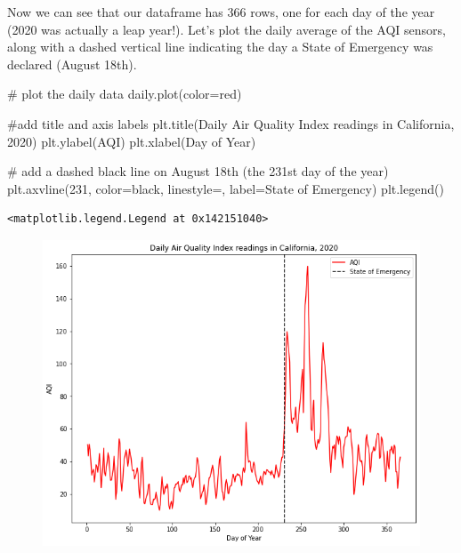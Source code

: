 \documentclass[
  letterpaper,
  DIV=11,
  numbers=noendperiod]{scrreprt}
\newenvironment{Shaded}{\begin{snugshade}}{\end{snugshade}}
\newcommand{\CommentTok}[1]{\textcolor[rgb]{0.37,0.37,0.37}{#1}}
\newcommand{\DecValTok}[1]{\textcolor[rgb]{0.68,0.00,0.00}{#1}}
\newcommand{\NormalTok}[1]{\textcolor[rgb]{0.00,0.23,0.31}{#1}}
\newcommand{\OperatorTok}[1]{\textcolor[rgb]{0.37,0.37,0.37}{#1}}
\newcommand{\StringTok}[1]{\textcolor[rgb]{0.13,0.47,0.30}{#1}}
\begin{document}
Now we can see that our dataframe has 366 rows, one for each day of the
year (2020 was actually a leap year!). Let's plot the daily average of
the AQI sensors, along with a dashed vertical line indicating the day a
State of Emergency was declared (August 18th).

\begin{Shaded}
\begin{Highlighting}[]
\CommentTok{\# plot the daily data}
\NormalTok{daily.plot(color}\OperatorTok{=}\StringTok{\textquotesingle{}red\textquotesingle{}}\NormalTok{)}

\CommentTok{\#add title and axis labels}
\NormalTok{plt.title(}\StringTok{\textquotesingle{}Daily Air Quality Index readings in California, 2020\textquotesingle{}}\NormalTok{)}
\NormalTok{plt.ylabel(}\StringTok{\textquotesingle{}AQI\textquotesingle{}}\NormalTok{)}
\NormalTok{plt.xlabel(}\StringTok{\textquotesingle{}Day of Year\textquotesingle{}}\NormalTok{)}

\CommentTok{\# add a dashed black line on August 18th (the 231st day of the year)}
\NormalTok{plt.axvline(}\DecValTok{231}\NormalTok{, color}\OperatorTok{=}\StringTok{\textquotesingle{}black\textquotesingle{}}\NormalTok{, linestyle}\OperatorTok{=}\StringTok{\textquotesingle{}{-}{-}\textquotesingle{}}\NormalTok{, label}\OperatorTok{=}\StringTok{\textquotesingle{}State of Emergency\textquotesingle{}}\NormalTok{)}
\NormalTok{plt.legend()}
\end{Highlighting}
\end{Shaded}

\begin{verbatim}
<matplotlib.legend.Legend at 0x142151040>
\end{verbatim}

\begin{figure}[H]

{\centering \includegraphics{notebooks/W03. Spatial Data_files/figure-pdf/cell-10-output-2.png}

}

\end{figure}
\end{document}
